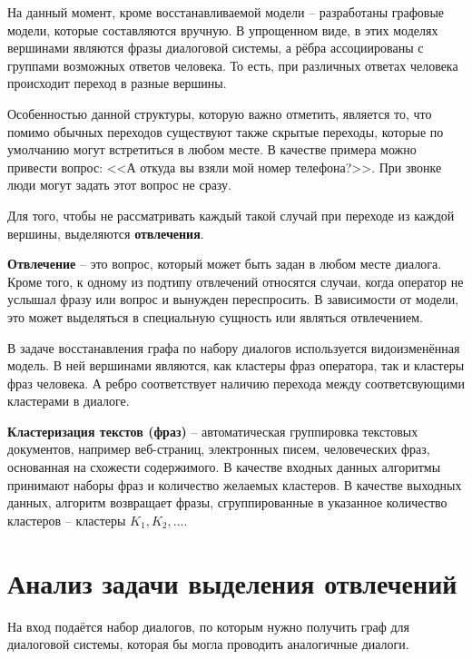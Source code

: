 \documentclass[times,specification,annotation]{itmo-student-thesis}
\begin{document}
	
	На данный момент, кроме восстанавливаемой модели -- разработаны графовые модели, которые составляются вручную. В упрощенном виде, в этих моделях вершинами являются фразы диалоговой системы, а рёбра ассоциированы с группами возможных ответов человека. То есть, при различных ответах человека происходит переход в разные вершины.%
	
	Особенностью данной структуры, которую важно отметить, является то, что помимо обычных переходов существуют также скрытые переходы, которые по умолчанию могут встретиться в любом месте. В качестве примера можно привести вопрос: <<А откуда вы взяли мой номер телефона?>>. При звонке люди могут задать этот вопрос не сразу.
	
	Для того, чтобы не рассматривать каждый такой случай при переходе из каждой вершины, выделяются \textbf{отвлечения}.
	
	\textbf{Отвлечение} -- это вопрос, который может быть задан в любом месте диалога. Кроме того, к одному из подтипу отвлечений относятся случаи, когда оператор не услышал фразу или вопрос и вынужден переспросить. В зависимости от модели, это может выделяться в специальную сущность или являться отвлечением.
	
	В задаче восстанавления графа по набору диалогов используется видоизменённая модель. В ней вершинами являются, как кластеры фраз оператора, так и кластеры фраз человека. А ребро соответствует наличию перехода между соответсвующими кластерами в диалоге.
	
	\textbf{Кластеризация текстов (фраз)}\cite{Li2009} -- автоматическая группировка текстовых документов, например веб-страниц, электронных писем, человеческих фраз, основанная на схожести содержимого. В качестве входных данных алгоритмы принимают наборы фраз и количество желаемых кластеров. В качестве выходных данных, алгоритм возвращает фразы, сгруппированные в указанное количество кластеров -- кластеры $K_1, K_2, ...$.
	
	\section{Анализ задачи выделения отвлечений}
	На вход подаётся набор диалогов, по которым нужно получить граф для диалоговой системы, которая бы могла проводить аналогичные диалоги.
	
\end{document}
